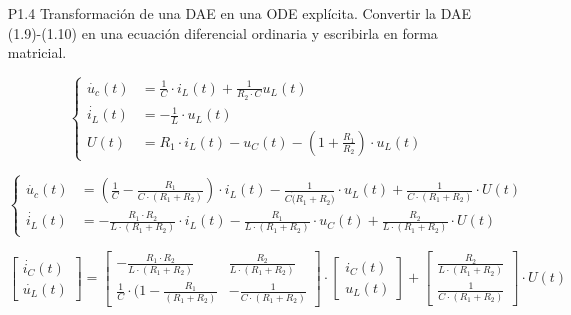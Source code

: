 \documentclass{article}
\begin{document}
\begin{itemize}
\begin{enumerate}[a)]
\end{enumerate}
  \item[P1.4] Transformación de una DAE en una ODE explícita. Convertir la DAE (1.9)-(1.10) en una ecuación diferencial ordinaria y escribirla en forma matricial.

\begin{equation*}
\left\{ \begin{array}{rl}
  \dot{u_{c}}(t) &= \frac{1}{C} \cdot i_{L}(t) + \frac{1}{R_{2} \cdot C} u_{L}(t)\\
  \dot{i_{L}}(t) &= - \frac{1}{L} \cdot u_{L}(t) \\
  U(t) &= R_{1} \cdot i_{L}(t) - u_{C}(t) - (1+ \frac{R_{1}}{R_{2}}) \cdot u_{L}(t)
       \end{array} \right .
\end{equation*}

\begin{equation*}
\left\{ \begin{array}{rl}
  \dot{u_{c}}(t) &= (\frac{1}{C} - \frac{R_{1}}{C\cdot (R_{1} + R_{2})}) \cdot i_{L}(t) - \frac{1}{C \dot (R_{1} + R_{2})} \cdot u_{L}(t) + \frac{1}{C \cdot (R_1 + R_2)} \cdot U(t)\\
  \dot{i_{L}}(t) &= - \frac{R_1 \cdot R_2}{L \cdot (R_1 + R_2)} \cdot i_L(t) - \frac{R_1}{L\cdot (R_1 + R_2)} \cdot u_C(t) + \frac{R_2}{L \cdot (R_1+R_2)} \cdot U(t)
       \end{array} \right .
\end{equation*}

\begin{equation*}
\begin{bmatrix}
   \dot{i_C}(t) \\
   \dot{u_L}(t) 
 \end{bmatrix}
=
\begin{bmatrix}
  - \frac{R_1 \cdot R_2}{L\cdot (R_1+R_2)} &  \frac{R_2}{L\cdot (R_1 + R_2)} \\
  \frac{1}{C} \cdot (1 - \frac{R_1}{(R_1+R_2)} & - \frac{1}{C \cdot (R_1 + R_2)} 
\end{bmatrix} 
\cdot 
\begin{bmatrix}
   i_C(t) \\
   u_L(t) 
\end{bmatrix}
+
\begin{bmatrix}
   \frac{R_2}{L\cdot(R_1+R_2)} \\
   \frac{1}{C \cdot (R_1+R_2)}
\end{bmatrix}
\cdot
U(t)
\end{equation*}






\end{itemize}
\end{document}
